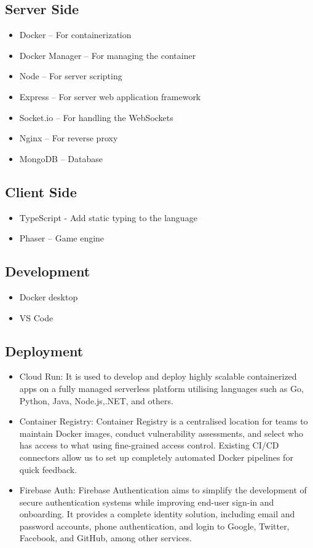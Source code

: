 \documentclass[oneside,12pt]{Classes/VTU}
\begin{document}
			\subsection{Server Side}
				\begin{itemize}
					\item Docker – For containerization
					\item Docker Manager – For managing the container
					\item Node – For server scripting
					\item Express – For server web application framework
					\item Socket.io – For handling the WebSockets
					\item Nginx – For reverse proxy
					\item MongoDB – Database
				\end{itemize}
			
			\subsection{Client Side}
				\begin{itemize}
					\item TypeScript - Add static typing to the language
					\item Phaser – Game engine
				\end{itemize}
			
			\subsection{Development}
				\begin{itemize}
					\item Docker desktop
					\item VS Code
				\end{itemize}
			
			\subsection{Deployment}
				\begin{itemize}
					\item Cloud Run: It is used to develop and deploy highly scalable containerized apps on a fully managed serverless platform utilising languages such as Go, Python, Java, Node.js,.NET, and others. 
					
					\item Container Registry: Container Registry is a centralised location for teams to maintain Docker images, conduct vulnerability assessments, and select who has access to what using fine-grained access control. Existing CI/CD connectors allow us to set up completely automated Docker pipelines for quick feedback.
					
					\item Firebase Auth: Firebase Authentication aims to simplify the development of secure authentication systems while improving end-user sign-in and onboarding. It provides a complete identity solution, including email and password accounts, phone authentication, and login to Google, Twitter, Facebook, and GitHub, among other services.
				\end{itemize}
			
\end{document}
